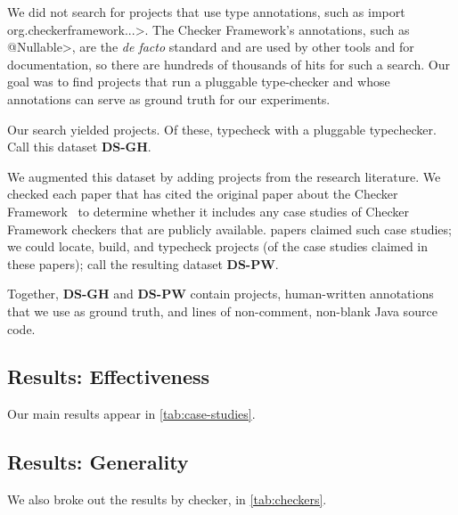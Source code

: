 We did not search for projects that use type annotations, such as
\<import org.checkerframework...>.  The Checker Framework's annotations,
such as \<@Nullable>, are the \emph{de facto} standard and are used by
other tools and for documentation, so there are hundreds of thousands of
hits for such a search.
Our goal was to find projects that run a pluggable type-checker and
whose annotations can serve as ground truth for our experiments.

Our search yielded  projects.
Of these,  typecheck with a pluggable typechecker.
Call this dataset \textbf{DS-GH}.

We augmented this dataset by adding projects from the research literature.
We checked each paper that has cited the original paper
about the Checker Framework~\cite{PapiACPE2008} to determine whether it includes any
case studies of Checker Framework checkers that are publicly available.  papers
claimed such case studies; we could locate, build, and typecheck  projects (of
the  case studies claimed in these papers); call the resulting dataset \textbf{DS-PW}.

Together, \textbf{DS-GH} and \textbf{DS-PW} contain  projects,  human-written
annotations that we use as ground truth, and  lines of non-comment, non-blank Java
source code.


\subsection{Results: Effectiveness}
\label{sec:results}

Our main results appear in \cref{tab:case-studies}. 


\subsection{Results: Generality}
\label{sec:by-checker}



We also broke out the results by checker, in \cref{tab:checkers}. 


